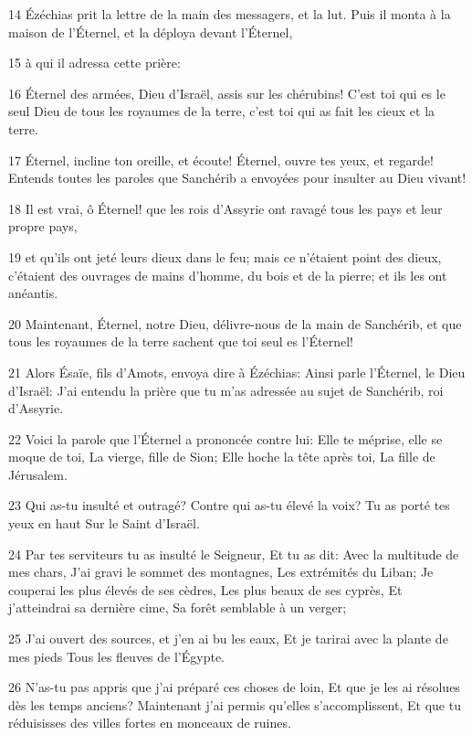 \par 14 Ézéchias prit la lettre de la main des messagers, et la lut. Puis il monta à la maison de l'Éternel, et la déploya devant l'Éternel,
\par 15 à qui il adressa cette prière:
\par 16 Éternel des armées, Dieu d'Israël, assis sur les chérubins! C'est toi qui es le seul Dieu de tous les royaumes de la terre, c'est toi qui as fait les cieux et la terre.
\par 17 Éternel, incline ton oreille, et écoute! Éternel, ouvre tes yeux, et regarde! Entends toutes les paroles que Sanchérib a envoyées pour insulter au Dieu vivant!
\par 18 Il est vrai, ô Éternel! que les rois d'Assyrie ont ravagé tous les pays et leur propre pays,
\par 19 et qu'ils ont jeté leurs dieux dans le feu; mais ce n'étaient point des dieux, c'étaient des ouvrages de mains d'homme, du bois et de la pierre; et ils les ont anéantis.
\par 20 Maintenant, Éternel, notre Dieu, délivre-nous de la main de Sanchérib, et que tous les royaumes de la terre sachent que toi seul es l'Éternel!
\par 21 Alors Ésaïe, fils d'Amots, envoya dire à Ézéchias: Ainsi parle l'Éternel, le Dieu d'Israël: J'ai entendu la prière que tu m'as adressée au sujet de Sanchérib, roi d'Assyrie.
\par 22 Voici la parole que l'Éternel a prononcée contre lui: Elle te méprise, elle se moque de toi, La vierge, fille de Sion; Elle hoche la tête après toi, La fille de Jérusalem.
\par 23 Qui as-tu insulté et outragé? Contre qui as-tu élevé la voix? Tu as porté tes yeux en haut Sur le Saint d'Israël.
\par 24 Par tes serviteurs tu as insulté le Seigneur, Et tu as dit: Avec la multitude de mes chars, J'ai gravi le sommet des montagnes, Les extrémités du Liban; Je couperai les plus élevés de ses cèdres, Les plus beaux de ses cyprès, Et j'atteindrai sa dernière cime, Sa forêt semblable à un verger;
\par 25 J'ai ouvert des sources, et j'en ai bu les eaux, Et je tarirai avec la plante de mes pieds Tous les fleuves de l'Égypte.
\par 26 N'as-tu pas appris que j'ai préparé ces choses de loin, Et que je les ai résolues dès les temps anciens? Maintenant j'ai permis qu'elles s'accomplissent, Et que tu réduisisses des villes fortes en monceaux de ruines.
